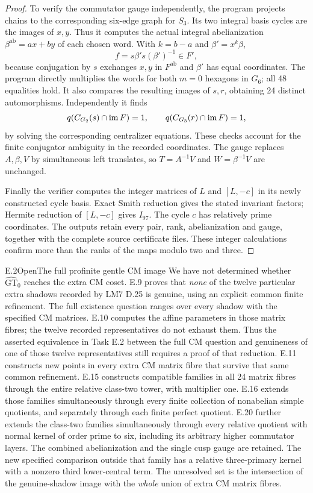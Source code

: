 \begin{proof}
To verify the commutator gauge independently, the program projects
chains to the corresponding six-edge graph for $S_3$. Its two
integral basis cycles are the images of $x,y$. Thus it computes the
actual integral abelianization $\beta^{\mathrm{ab}}=ax+by$ of each
chosen word. With $k=b-a$ and $\beta'=x^k\beta$,
\[
 f=s\beta's(\beta')^{-1}\in F',
\]
because conjugation by $s$ exchanges $x,y$ in $F^{\mathrm{ab}}$ and
$\beta'$ has equal coordinates. The program directly multiplies the
words for both $m=0$ hexagons in $G_6$; all 48 equalities hold.
It also compares the resulting images of $s,r$, obtaining 24 distinct
automorphisms. Independently it finds
\[
 q(C_{G_2}(s)\cap\operatorname{im} F)=1,
 \qquad q(C_{G_3}(r)\cap\operatorname{im} F)=1,
\]
by solving the corresponding centralizer equations. These checks
account for the finite conjugator ambiguity in the recorded
coordinates. The gauge replaces $A,\beta,V$ by simultaneous left
translates, so $T=A^{-1}V$ and $W=\beta^{-1}V$ are unchanged.

Finally the verifier computes the integer matrices of $L$ and
$[L,-c]$ in its newly constructed cycle basis. Exact Smith reduction
gives the stated invariant factors; Hermite reduction of $[L,-c]$
gives $I_{97}$. The cycle $c$ has relatively prime coordinates.
The outputs retain every pair, rank, abelianization and gauge, together
with the complete source certificate files. These integer calculations
confirm more than the ranks of the maps modulo two and three.
\end{proof}

\begin{statement}{E.2}{Open}{The full profinite gentle CM image}
We have not determined whether $\widehat{\mathrm{GT}}_0$ reaches the
extra CM coset. E.9 proves that \emph{none} of the twelve particular
extra shadows recorded by LM7 D.25 is genuine, using an explicit
common finite refinement. The full existence question ranges over
every shadow with the specified CM matrices. E.10 computes the
affine parameters in those matrix fibres; the twelve recorded
representatives do not exhaust them. Thus the asserted equivalence
in Task E.2 between the full CM question and genuineness of one of
those twelve representatives still requires a proof of that reduction.
E.11 constructs new points in every extra CM matrix fibre that
survive that same common refinement. E.15 constructs compatible
families in all 24 matrix fibres through the entire relative
class-two tower, with multiplier one. E.16 extends those families
simultaneously through every finite collection of nonabelian simple
quotients, and separately through each finite perfect quotient.
E.20 further extends the class-two families simultaneously through
every relative quotient with normal kernel of order prime to six,
including its arbitrary higher commutator layers. The combined
abelianization and the single cusp gauge are retained. The new
specified comparison outside that family has a relative three-primary
kernel with a nonzero third lower-central term. The unresolved set is the
intersection of the genuine-shadow image with the \emph{whole}
union of extra CM matrix fibres.
\end{statement}

